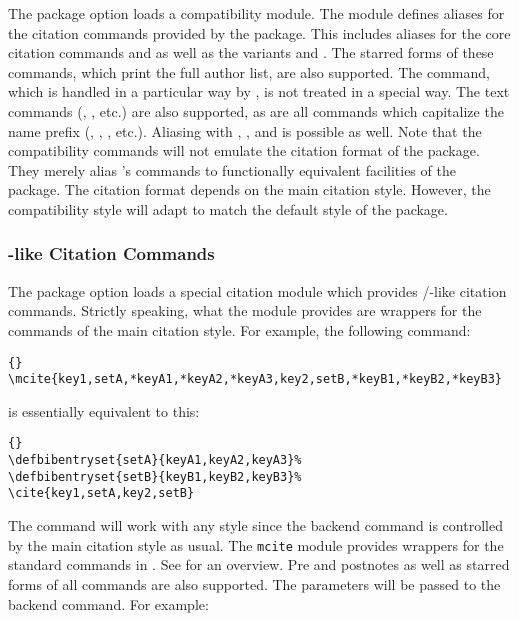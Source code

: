 \documentclass{ltxdockit}[2011/03/25]
\begin{document}
The  package option loads a  compatibility module. The module defines aliases for the citation commands provided by the  package. This includes aliases for the core citation commands  and  as well as the variants  and . The starred forms of these commands, which print the full author list, are also supported. The  command, which is handled in a particular way by , is not treated in a special way. The text commands (, , etc.) are also supported, as are all commands which capitalize the name prefix (, , , etc.). Aliasing with , , and  is possible as well. Note that the compatibility commands will not emulate the citation format of the  package. They merely alias 's commands to functionally equivalent facilities of the  package. The citation format depends on the main citation style. However, the compatibility style will adapt  to match the default style of the  package.

\subsubsection[\sty{mcite}-like Citation Commands]{-like Citation Commands\BiberOnlyMark}
\label{use:cit:mct}

The  package option loads a special citation module which provides \slash {}-like citation commands. Strictly speaking, what the module provides are wrappers for the commands of the main citation style. For example, the following command:

\begin{lstlisting}[style=latex]{}
\mcite{key1,setA,*keyA1,*keyA2,*keyA3,key2,setB,*keyB1,*keyB2,*keyB3}
\end{lstlisting}
%
is essentially equivalent to this:

\begin{lstlisting}[style=latex]{}
\defbibentryset{setA}{keyA1,keyA2,keyA3}%
\defbibentryset{setB}{keyB1,keyB2,keyB3}%
\cite{key1,setA,key2,setB}
\end{lstlisting}
%
The  command will work with any style since the  backend command is controlled by the main citation style as usual. The \texttt{mcite} module provides wrappers for the standard commands in . See  for an overview. Pre and postnotes as well as starred forms of all commands are also supported. The parameters will be passed to the backend command. For example:
\end{document}

